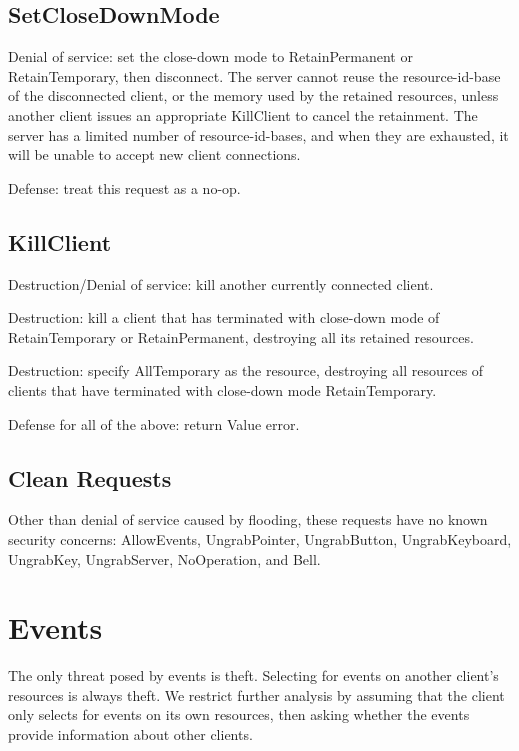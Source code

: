 \subsection{SetCloseDownMode}

Denial of service: set the close-down mode to RetainPermanent or
RetainTemporary, then disconnect.  The server cannot reuse the
resource-id-base of the disconnected client, or the memory used by the
retained resources, unless another client issues an appropriate
KillClient to cancel the retainment.  The server has a limited number
of resource-id-bases, and when they are exhausted, it will be unable
to accept new client connections.

Defense: treat this request as a no-op.


\subsection{KillClient}

Destruction/Denial of service: kill another currently connected
client.

Destruction: kill a client that has terminated with close-down mode
of RetainTemporary or RetainPermanent, destroying all its retained
resources.

Destruction: specify AllTemporary as the resource, destroying all
resources of clients that have terminated with close-down mode
RetainTemporary.

Defense for all of the above: return Value error.



\subsection{Clean Requests}

Other than denial of service caused by flooding, these requests have
no known security concerns: AllowEvents, UngrabPointer, UngrabButton,
UngrabKeyboard, UngrabKey, UngrabServer, NoOperation, and Bell.



\section{Events}

The only threat posed by events is theft.  Selecting for events on
another client's resources is always theft.  We restrict further
analysis by assuming that the client only selects for events on its
own resources, then asking whether the events provide information
about other clients.



